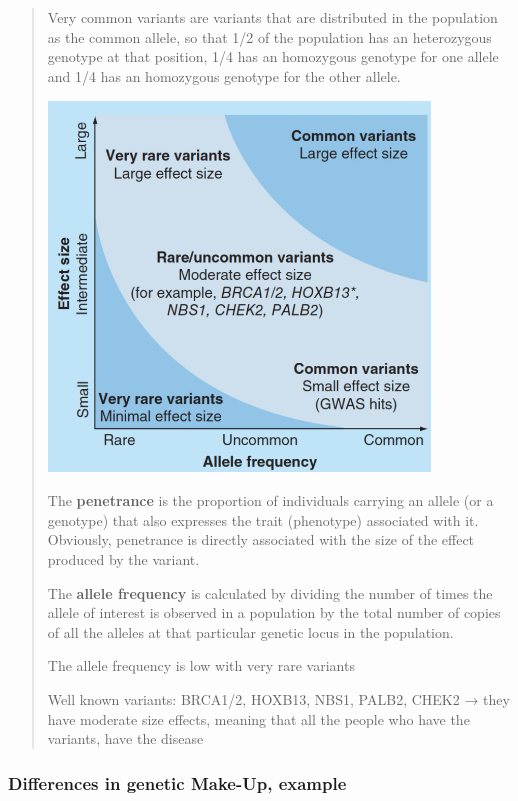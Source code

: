 \begin{quote}
Very common variants are variants that are distributed in the population
as the common allele, so that 1/2 of the population has an heterozygous
genotype at that position, 1/4 has an homozygous genotype for one allele
and 1/4 has an homozygous genotype for the other allele.

\includegraphics[width=3.9928in,height=3.87812in]{image4.jpeg}

The \textbf{penetrance} is the proportion of individuals carrying an
allele (or a genotype) that also expresses the trait (phenotype)
associated with it. Obviously, penetrance is directly associated with
the size of the effect produced by the variant.

The \textbf{allele frequency} is calculated by dividing the number of
times the allele of interest is observed in a population by the total
number of copies of all the alleles at that particular genetic locus in
the population.

The allele frequency is low with very rare variants

Well known variants: BRCA1/2, HOXB13, NBS1, PALB2, CHEK2 → they have
moderate size effects, meaning that all the people who have the
variants, have the disease
\end{quote}

\hypertarget{differences-in-genetic-make-up-example}{%
\subsubsection{Differences in genetic Make-Up,
example}\label{differences-in-genetic-make-up-example}}

